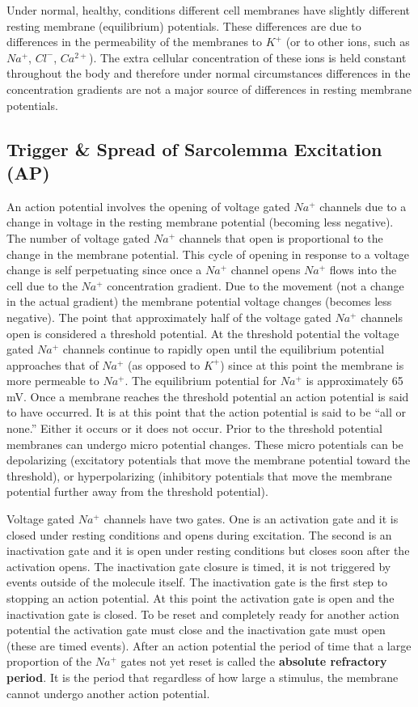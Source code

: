 Under normal, healthy, conditions different cell membranes have slightly different resting membrane (equilibrium) potentials. These differences are due to differences in the permeability of the membranes to $K^+$ (or to other ions, such as $Na^+$, $Cl^-$, $Ca^{2+}$). The extra cellular concentration of these ions is held constant throughout the body and therefore under normal circumstances differences in the concentration gradients are not a major source of differences in resting membrane potentials. 


\subsection{Trigger \& Spread of Sarcolemma Excitation (AP)}

An action potential involves the opening of voltage gated $Na^+$ channels due to a change in voltage in the resting membrane potential (becoming less negative). The number of voltage gated $Na^+$ channels that open is proportional to the change in the membrane potential. This cycle of opening in response to a voltage change is self perpetuating since once a $Na^+$ channel opens $Na^+$ flows into the cell due to the $Na^+$ concentration gradient. Due to the movement (not a change in the actual gradient) the membrane potential voltage changes (becomes less negative). The point that approximately half of the voltage gated $Na^+$ channels open is considered a threshold potential. At the threshold potential the voltage gated $Na^+$ channels continue to rapidly open until the equilibrium potential approaches that of $Na^+$ (as opposed to $K^+$) since at this point the membrane is more permeable to $Na^+$. The equilibrium potential for $Na^+$ is approximately 65 mV.  Once a membrane reaches the threshold potential an action potential is said to have occurred. It is at this point that the action potential is said to be “all or none.” Either it occurs or it does not occur. Prior to the threshold potential membranes can undergo micro potential changes. These micro potentials can be depolarizing (excitatory potentials that move the membrane potential toward the threshold), or hyperpolarizing (inhibitory potentials that move the membrane potential further away from the threshold potential).

Voltage gated $Na^+$ channels have two gates. One is an activation gate and it is closed under resting conditions and opens during excitation. The second is an inactivation gate and it is open under resting conditions but closes soon after the activation opens. The inactivation gate closure is timed, it is not triggered by events outside of the molecule itself. The inactivation gate is the first step to stopping an action potential. At this point the activation gate is open and the inactivation gate is closed. To be reset and completely ready for another action potential the activation gate must close and the inactivation gate must open (these are timed events). After an action potential the period of time that a large proportion of the $Na^+$ gates not yet reset is called the \textbf{absolute refractory period}. It is the period that regardless of how large a stimulus, the membrane cannot undergo another action potential. 

